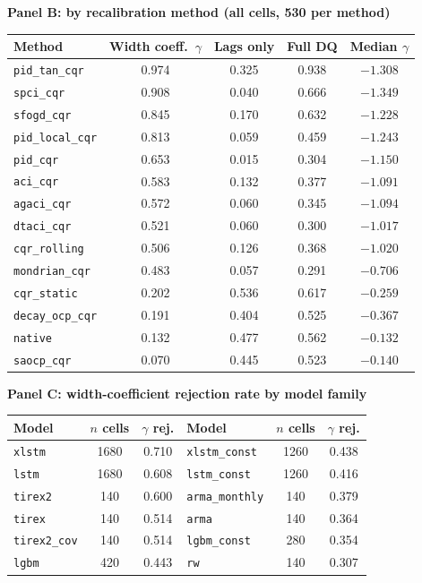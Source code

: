 \begin{table}[t]
\vspace{3mm}
\textbf{Panel B: by recalibration method (all cells, 530 per method)}\\[1mm]
\begin{tabular}{lcccc}
\toprule
Method & Width coeff.\ $\gamma$ & Lags only & Full DQ & Median $\gamma$ \\
\midrule
\texttt{pid\_tan\_cqr}   & 0.974 & 0.325 & 0.938 & $-1.308$ \\
\texttt{spci\_cqr}       & 0.908 & 0.040 & 0.666 & $-1.349$ \\
\texttt{sfogd\_cqr}      & 0.845 & 0.170 & 0.632 & $-1.228$ \\
\texttt{pid\_local\_cqr} & 0.813 & 0.059 & 0.459 & $-1.243$ \\
\texttt{pid\_cqr}        & 0.653 & 0.015 & 0.304 & $-1.150$ \\
\texttt{aci\_cqr}        & 0.583 & 0.132 & 0.377 & $-1.091$ \\
\texttt{agaci\_cqr}      & 0.572 & 0.060 & 0.345 & $-1.094$ \\
\texttt{dtaci\_cqr}      & 0.521 & 0.060 & 0.300 & $-1.017$ \\
\texttt{cqr\_rolling}    & 0.506 & 0.126 & 0.368 & $-1.020$ \\
\texttt{mondrian\_cqr}   & 0.483 & 0.057 & 0.291 & $-0.706$ \\
\addlinespace
\texttt{cqr\_static}     & 0.202 & 0.536 & 0.617 & $-0.259$ \\
\texttt{decay\_ocp\_cqr} & 0.191 & 0.404 & 0.525 & $-0.367$ \\
\texttt{native}          & 0.132 & 0.477 & 0.562 & $-0.132$ \\
\texttt{saocp\_cqr}      & 0.070 & 0.445 & 0.523 & $-0.140$ \\
\bottomrule
\end{tabular}

\vspace{3mm}
\textbf{Panel C: width-coefficient rejection rate by model family}\\[1mm]
\begin{tabular}{lcc@{\hskip 8mm}lcc}
\toprule
Model & $n$ cells & $\gamma$ rej. & Model & $n$ cells & $\gamma$ rej. \\
\midrule
\texttt{xlstm}        & 1680 & 0.710 & \texttt{xlstm\_const} & 1260 & 0.438 \\
\texttt{lstm}         & 1680 & 0.608 & \texttt{lstm\_const}  & 1260 & 0.416 \\
\texttt{tirex2}       &  140 & 0.600 & \texttt{arma\_monthly}&  140 & 0.379 \\
\texttt{tirex}        &  140 & 0.514 & \texttt{arma}         &  140 & 0.364 \\
\texttt{tirex2\_cov}  &  140 & 0.514 & \texttt{lgbm\_const}  &  280 & 0.354 \\
\texttt{lgbm}         &  420 & 0.443 & \texttt{rw}           &  140 & 0.307 \\
\bottomrule
\end{tabular}


\end{table}

